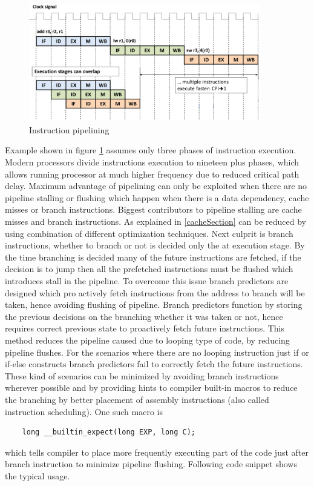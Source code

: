 \begin{figure}[h]
	\centering
	\includegraphics[width=0.9\textwidth]{./figures/pipeline_seq2_edited.pdf}
	\caption{Instruction pipelining}
	\label{fig:pipeline}
\end{figure}

Example shown in figure \ref{fig:pipeline} assumes only three phases of instruction execution. Modern processors divide instructions execution to nineteen plus phases, which allows running processor at much higher frequency due to reduced critical path delay. Maximum advantage of pipelining can only be exploited when there are no pipeline stalling or flushing which happen when there is a data dependency, cache misses or branch instructions. Biggest contributors to pipeline stalling are cache misses and branch instructions. As explained in \ref{cacheSection} can be reduced by using combination of different optimization techniques. Next culprit is branch instructions, whether to branch or not is decided only the at execution stage. By the time branching is decided many of the future instructions are fetched, if the decision is to jump then all the prefetched instructions must be flushed which introduces stall in the pipeline. To overcome this issue branch predictors are designed which pro actively fetch instructions from the address to branch will be taken, hence avoiding flushing of pipeline. Branch predictors function by storing the previous decisions on the branching whether it was taken or not, hence requires correct previous state to proactively fetch future instructions. This method reduces the pipeline caused due to looping type of code, by reducing pipeline flushes. For the scenarios where there are no looping instruction just if or if-else constructs branch predictors fail to correctly fetch the future instructions. These kind of scenarios can be minimized by avoiding branch instructions wherever possible and by providing hints to compiler built-in macros to reduce the branching by better placement of assembly instructions (also called instruction scheduling). One such macro is 
\begin{verbatim}
	long __builtin_expect(long EXP, long C); 
\end{verbatim}
which tells compiler to place more frequently executing part of the code just after branch instruction to minimize pipeline flushing. Following code snippet shows the typical usage.

